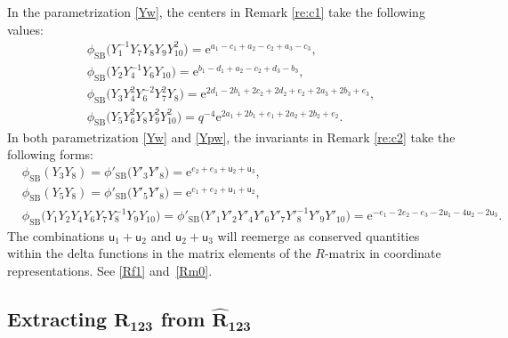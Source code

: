 \documentclass[pdftex]{sigma}
\newcommand{\e}{{\mathrm e}}
\newcommand{\uu}{{\mathsf u}}
\numberwithin{equation}{section}
\begin{document}
\begin{Remark}\label{re:c3}
In the parametrization \eqref{Yw}, the centers in Remark \ref{re:c1} take the following values:
\begin{gather*}
\phi_\mathrm{SB}\bigl(Y^{-1}_1Y_7Y_8Y_9Y^2_{10}\bigr) =\e^{a_1-c_1+a_2-c_2+a_3-c_3},
\\
\phi_\mathrm{SB}\bigl(Y_2Y^{-1}_4Y_6Y_{10}\bigr) =\e^{b_1-d_1+a_2-c_2+d_3-b_3},
\\
\phi_\mathrm{SB}\bigl(Y_3Y^2_4Y^{-2}_6Y^2_7Y_8\bigr) = \e^{2d_1-2b_1+2c_2+2d_2+e_2+2a_3+2b_3+e_3},
\\
\phi_\mathrm{SB}\bigl(Y_5Y^2_6Y_8Y^2_9Y^2_{10}\bigr) =q^{-4}\e^{2a_1+2b_1+e_1+2a_2+2b_2+e_2}.
\end{gather*}
In both parametrization \eqref{Yw} and \eqref{Ypw}, the invariants in
Remark \ref{re:c2} take the following forms:
\begin{align}
&\phi_\mathrm{SB}(Y_3Y_8) = \phi'_\mathrm{SB}\bigl(Y'_3Y'_8\bigr) = \e^{e_2+e_3+\uu_2+\uu_3},
\label{Y3Y8-uw}
\\
&\phi_\mathrm{SB}(Y_5Y_8) = \phi'_\mathrm{SB}\bigl(Y'_5Y'_8\bigr) = \e^{e_1+e_2+\uu_1+\uu_2},
\label{Y5Y8-uw}
\\
&\phi_\mathrm{SB}\bigl(Y_1Y_2Y_4Y_6Y_7Y^{-1}_8Y_9Y_{10}\bigr)
=\phi'_\mathrm{SB}\bigl( Y'_1Y'_2Y'_4Y'_6Y'_7Y'^{-1}_8Y'_9Y'_{10}\bigr)
= \e^{-e_1-2e_2-e_3-2\uu_1-4\uu_2-2\uu_3}.\nonumber
\end{align}
The combinations $\uu_1+\uu_2$ and $\uu_2+\uu_3$ will reemerge as
conserved quantities within the delta functions in the matrix elements of the
$R$-matrix in coordinate representations.
See \eqref{Rf1} and~\eqref{Rm0}.
\end{Remark}


\subsection[Extracting R\_123 from R\_123]{Extracting $\boldsymbol{R_{123}}$ from $\boldsymbol{\widehat{R}_{123}}$}
\end{document}
